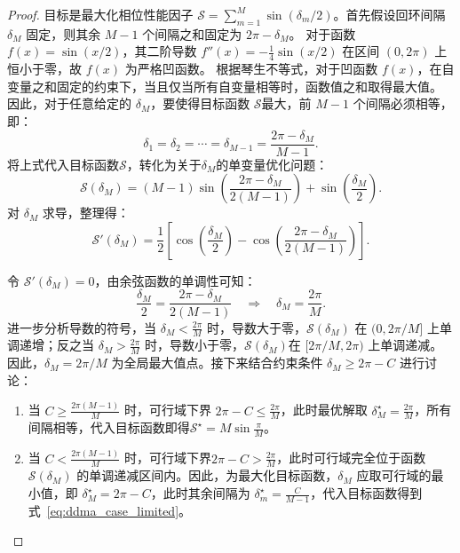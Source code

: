 \begin{proof}
	目标是最大化相位性能因子 $\mathcal{S} = \sum_{m=1}^M \sin(\delta_m/2)$。首先假设回环间隔 $\delta_M$ 固定，则其余 $M-1$ 个间隔之和固定为 $2\pi - \delta_M$。
	对于函数 $f(x) = \sin(x/2)$，其二阶导数 $f''(x) = -\frac{1}{4}\sin(x/2)$ 在区间 $(0, 2\pi)$ 上恒小于零，故 $f(x)$ 为严格凹函数。
	根据琴生不等式，对于凹函数 $f(x)$，在自变量之和固定的约束下，当且仅当所有自变量相等时，函数值之和取得最大值。
	因此，对于任意给定的 $\delta_M$，要使得目标函数 $\mathcal{S}$最大，前 $M-1$ 个间隔必须相等，即：
	\begin{equation}
		\delta_1 = \delta_2 = \cdots = \delta_{M-1} = \frac{2\pi - \delta_M}{M-1}.
	\end{equation}
	将上式代入目标函数$\mathcal{S}$，转化为关于$\delta_M$的单变量优化问题：
	\begin{equation}
		\mathcal{S}(\delta_M) = (M-1)\sin\left( \frac{2\pi - \delta_M}{2(M-1)} \right) + \sin\left( \frac{\delta_M}{2} \right).
	\end{equation}
	对 $\delta_M$ 求导，整理得：
	\begin{equation}
		\mathcal{S}'(\delta_M) = \frac{1}{2} \left[ \cos\left( \frac{\delta_M}{2} \right) - \cos\left( \frac{2\pi - \delta_M}{2(M-1)} \right) \right].
	\end{equation}
	
	令 $\mathcal{S}'(\delta_M) = 0$，由余弦函数的单调性可知：
	\begin{equation}
		\frac{\delta_M}{2} = \frac{2\pi - \delta_M}{2(M-1)}\quad \Rightarrow \quad \delta_M = \frac{2\pi}{M}.
	\end{equation}
	进一步分析导数的符号，当 $\delta_M < \frac{2\pi}{M}$ 时，导数大于零，$\mathcal{S}(\delta_M)$ 在 $(0, 2\pi/M]$ 上单调递增；反之当 $\delta_M > \frac{2\pi}{M}$ 时，导数小于零，$\mathcal{S}(\delta_M)$在 $[2\pi/M, 2\pi)$ 上单调递减。因此，$\delta_M = 2\pi/M$ 为全局最大值点。接下来结合约束条件 $\delta_M \ge 2\pi - C$ 进行讨论：
	\begin{enumerate}
		\item 当 $C \ge \frac{2\pi(M-1)}{M}$ 时，可行域下界 $2\pi - C \le \frac{2\pi}{M}$，此时最优解取 $\delta_M^\star = \frac{2\pi}{M}$，所有间隔相等，代入目标函数即得$\mathcal{S}^\star = M \sin \frac{\pi}{M}$。
		\item 当 $C < \frac{2\pi(M-1)}{M}$ 时，可行域下界$2\pi - C > \frac{2\pi}{M}$，此时可行域完全位于函数 $\mathcal{S}(\delta_M)$ 的单调递减区间内。因此，为最大化目标函数，$\delta_M$ 应取可行域的最小值，即 $\delta_M^\star = 2\pi - C$，此时其余间隔为 $\delta_m^\star = \frac{C}{M-1}$，代入目标函数得到式~\eqref{eq:ddma_case_limited}。
	\end{enumerate}
\end{proof}

